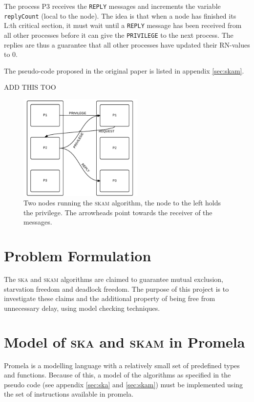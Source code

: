 \documentclass[a4paper,10pt]{llncs}
\begin{document}
The process P3 receives the \texttt{REPLY} messages and increments the variable \texttt{replyCount} (local to the node). The idea is that when a node has finished its L:th critical section, it must wait until a \texttt{REPLY} message has been received from all other processes before it can give the \texttt{PRIVILEGE} to the next process. The replies are thus a guarantee that all other processes have updated their RN-values to 0.

The pseudo-code proposed in the original paper is listed in appendix \ref{sec:skam}.

ADD THIS TOO

\begin{figure}[t]
\begin{center}
\includegraphics[width=0.55\textwidth]{Skaskam.pdf}
 \caption[Close up of \textit{Hemidactylus} sp.]
   {Two nodes running the \textsc{skam} algorithm, the node to the left holds the privilege. The arrowheads point towards the receiver of the messages.}
\end{center}
\end{figure}


\section{Problem Formulation}
The \textsc{ska} and \textsc{skam} algorithms are claimed to guarantee mutual exclusion, starvation freedom and deadlock freedom. The purpose of this project is to investigate these claims and the additional property of being free from unnecessary delay, using model checking techniques. 

\section{Model of \textsc{ska} and \textsc{skam} in Promela}
Promela is a modelling language with a relatively small set of predefined types and functions. Because of this, a model of the algorithms as specified in the pseudo code (see appendix \ref{sec:ska} and \ref{sec:skam}) must be implemented using the set of instructions available in promela.
\end{document}
